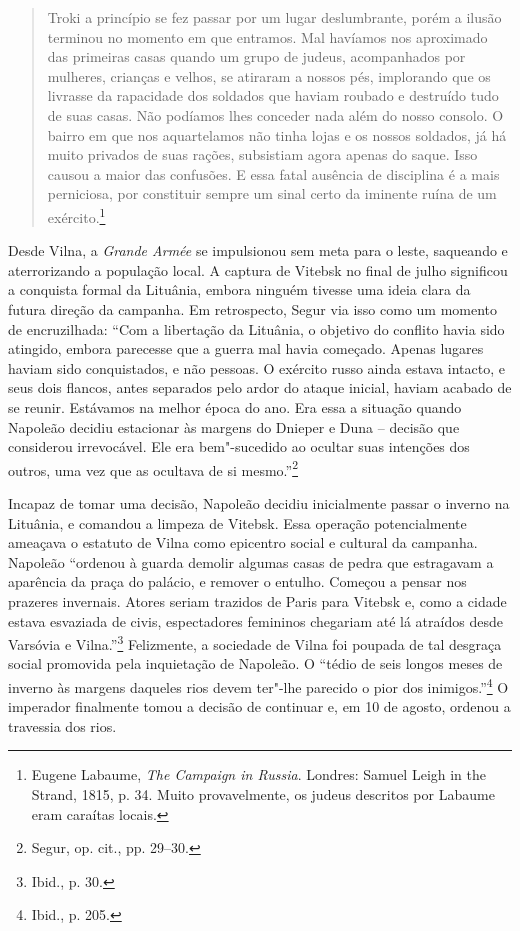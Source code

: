 \begin{quote}
Troki a princípio se fez passar por um lugar deslumbrante, porém a
ilusão terminou no momento em que entramos. Mal havíamos nos aproximado
das primeiras casas quando um grupo de judeus, acompanhados por
mulheres, crianças e velhos, se atiraram a nossos pés, implorando que os
livrasse da rapacidade dos soldados que haviam roubado e destruído tudo
de suas casas. Não podíamos lhes conceder nada além do nosso consolo. O
bairro em que nos aquartelamos não tinha lojas e os nossos soldados, já
há muito privados de suas rações, subsistiam agora apenas do saque. Isso
causou a maior das confusões. E essa fatal ausência de disciplina é a
mais perniciosa, por constituir sempre um sinal certo da iminente ruína
de um exército.\footnote{Eugene Labaume, \textit{The Campaign in Russia}. Londres: Samuel Leigh in the Strand, 1815, p. 34. Muito provavelmente, os judeus descritos por Labaume eram caraítas locais.} 
\end{quote}

Desde Vilna, a \textit{Grande Armée} se impulsionou sem meta para o leste,
saqueando e aterrorizando a população local. A captura de Vitebsk no
final de julho significou a conquista formal da Lituânia, embora ninguém
tivesse uma ideia clara da futura direção da campanha. Em retrospecto,
Segur via isso como um momento de encruzilhada: ``Com a libertação da
Lituânia, o objetivo do conflito havia sido atingido, embora parecesse
que a guerra mal havia começado. Apenas lugares haviam sido
conquistados, e não pessoas. O exército russo ainda estava intacto, e
seus dois flancos, antes separados pelo ardor do ataque inicial, haviam
acabado de se reunir. Estávamos na melhor época do ano. Era essa a
situação quando Napoleão decidiu estacionar às margens do Dnieper e Duna
-- decisão que considerou irrevocável. Ele era bem"-sucedido ao ocultar
suas intenções dos outros, uma vez que as ocultava de si
mesmo.''\footnote{Segur, op. cit., pp. 29--30.}

Incapaz de tomar uma decisão, Napoleão decidiu inicialmente passar o
inverno na Lituânia, e comandou a limpeza de Vitebsk. Essa operação
potencialmente ameaçava o estatuto de Vilna como epicentro social e
cultural da campanha. Napoleão ``ordenou à guarda demolir algumas casas
de pedra que estragavam a aparência da praça do palácio, e remover o
entulho. Começou a pensar nos prazeres invernais. Atores seriam trazidos
de Paris para Vitebsk e, como a cidade estava esvaziada de civis,
espectadores femininos chegariam até lá atraídos desde Varsóvia e
Vilna.''\footnote{Ibid., p. 30.} Felizmente, a sociedade de Vilna foi
poupada de tal desgraça social promovida pela inquietação de Napoleão. O
``tédio de seis longos meses de inverno às margens daqueles rios devem
ter"-lhe parecido o pior dos inimigos.''\footnote{Ibid., p. 205.} O
imperador finalmente tomou a decisão de continuar e, em 10 de agosto,
ordenou a travessia dos rios.

